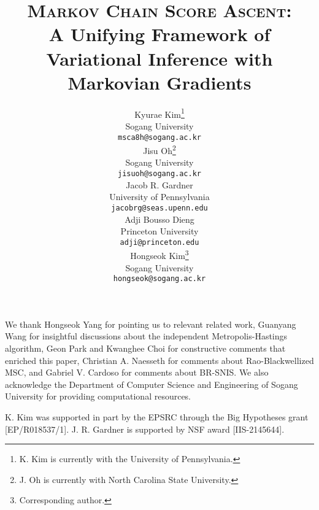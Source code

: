 \documentclass{article}
\title{\textsc{Markov Chain Score Ascent}: \\ A Unifying Framework of \\ Variational Inference with Markovian Gradients}
\author{%
  Kyurae Kim\thanks{K. Kim is currently with the University of Pennsylvania.} \\
  Sogang University\\
  \texttt{msca8h@sogang.ac.kr} \\
  \And
  Jisu Oh\thanks{J. Oh is currently with North Carolina State University.} \\
  Sogang University \\
  \texttt{jisuoh@sogang.ac.kr} \\
  \AND
  Jacob R. Gardner  \\
  University of Pennsylvania \\
  \texttt{jacobrg@seas.upenn.edu} \\
  \And
  Adji Bousso Dieng \\
  Princeton University \\
  \texttt{adji@princeton.edu} \\
  \And
  Hongseok Kim\thanks{Corresponding author.} \\
  Sogang University \\
  \texttt{hongseok@sogang.ac.kr} \\
}
\begin{document}
\maketitle

\begin{abstract}
  
\end{abstract}









\begin{ack}
  We thank Hongseok Yang for pointing us to relevant related work, Guanyang Wang for insightful discussions about the independent Metropolis-Hastings algorithm, Geon Park and Kwanghee Choi for constructive comments that enriched this paper, Christian A. Naesseth for comments about Rao-Blackwellized MSC, and Gabriel V. Cardoso for comments about BR-SNIS.
  We also acknowledge the Department of Computer Science and Engineering of Sogang University for providing computational resources.

  K. Kim was supported in part by the EPSRC through the Big Hypotheses grant [EP/R018537/1].
  J. R. Gardner is supported by NSF award [IIS-2145644].
\end{ack}

\newpage


\newpage
\appendix


\end{document}
